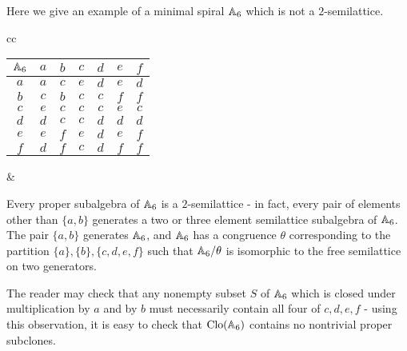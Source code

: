 \documentclass[letterpaper,11pt]{article}
\DeclareMathOperator{\Clo}{Clo}
\begin{document}
\begin{ex} Here we give an example of a minimal spiral $\mathbb{A}_6$ which is not a $2$-semilattice.
\begin{center}
\begin{tabular}{cc}
\begin{tabular}{c | c c c c c c} $\mathbb{A}_6$ & $a$ & $b$ & $c$ & $d$ & $e$ & $f$\\ \hline $a$ & $a$ & $c$ & $e$ & $d$ & $e$ & $d$\\ $b$ & $c$ & $b$ & $c$ & $c$ & $f$ & $f$\\ $c$ & $e$ & $c$ & $c$ & $c$ & $e$ & $c$\\ $d$ & $d$ & $c$ & $c$ & $d$ & $d$ & $d$\\ $e$ & $e$ & $f$ & $e$ & $d$ & $e$ & $f$\\ $f$ & $d$ & $f$ & $c$ & $d$ & $f$ & $f$ \end{tabular} &
\end{tabular}
\end{center}
Every proper subalgebra of $\mathbb{A}_6$ is a $2$-semilattice - in fact, every pair of elements other than $\{a,b\}$ generates a two or three element semilattice subalgebra of $\mathbb{A}_6$. The pair $\{a,b\}$ generates $\mathbb{A}_6$, and $\mathbb{A}_6$ has a congruence $\theta$ corresponding to the partition $\{a\}, \{b\}, \{c,d,e,f\}$ such that $\mathbb{A}_6/\theta$ is isomorphic to the free semilattice on two generators.

The reader may check that any nonempty subset $S$ of $\mathbb{A}_6$ which is closed under multiplication by $a$ and by $b$ must necessarily contain all four of $c,d,e,f$ - using this observation, it is easy to check that $\Clo(\bA_6)$ contains no nontrivial proper subclones.
\end{ex}
\end{document}
